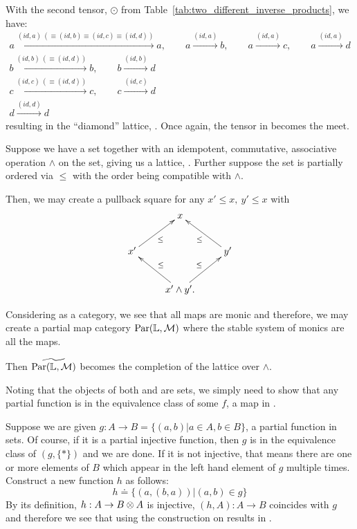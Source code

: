 With the second tensor, $\odot$ from Table~\ref{tab:two_different_inverse_products}, we have:
\begin{align*}
  a \xrightarrow{(id,a) \ (\equiv (id, b) \equiv (id,c) \equiv (id,d))} a, \qquad
    a \xrightarrow{(id,a)} b, \qquad a \xrightarrow{(id, a)} c , \qquad a \xrightarrow{(id, a)} d \\
  b \xrightarrow{(id,b) \ (\equiv (id, d))} b ,  \qquad b \xrightarrow{(id,b)} d\\
  c \xrightarrow{(id, c) \ (\equiv (id, d))} c,   \qquad c \xrightarrow{(id,c)} d\\
  d \xrightarrow{(id,d)} d
\end{align*}
resulting in the ``diamond'' lattice, . Once again, the tensor in \D becomes the meet.

\begin{example}\label{example:lattice_completion}
  Suppose we have a set together with an idempotent, commutative, associative operation $\wedge$ on
  the set, giving us a lattice, \Lat. Further suppose the set is partially ordered via $\le$ with
  the order being compatible with $\wedge$.

  Then, we may create a pullback square for any $x' \le x,\ y' \le x$ with
  \[
    \xymatrix{
      &x\\
      x' \ar[ur]_{\le} & & y' \ar[ul]^{\le}\\
      &x'\wedge y'.  \ar[ul]_{\le} \ar[ur]^{\le}
    }
  \]

  Considering \Lat as a category, we see that all maps are monic and therefore, we may create a
  partial map category $\text{Par}(\mathbb{L},\mathcal{M})$ where the stable system of monics are all the maps.

  Then $\widetilde{\text{Par}(\mathbb{L},\mathcal{M})}$ becomes the completion of the lattice over $\wedge$.
\end{example}
\begin{example}\label{ex:tilde_pinj_is_par}
  Noting that the objects of both \pinj and \Par are sets, we simply need to show that any partial
  function is in the equivalence class of some $f$, a map in \pinj.

  Suppose we are given $g : A \to B = \{(a,b) | a \in A, b\in B\}$, a partial function in sets. Of
  course, if it is a partial injective function, then $g$ is in the equivalence class of $(g,\{*\})$
  and we are done.  If it is not injective, that means there are one or more elements of $B$ which
  appear in the left hand element of $g$ multiple times. Construct a new function $h$ as follows:
  \begin{equation}
     h \doteq \{(a,(b,a)) | (a,b) \in g\} \label{eq:new_partial_injective}
  \end{equation}
  By its definition, $h : A \to B \otimes A$ is injective, $(h,A): A \to B$ coincides with $g$ and therefore
  we see that using the \wtc construction on \pinj results in \Par.
\end{example}


